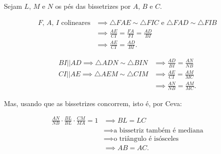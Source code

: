 Sejam $L$, $M$ e $N$ os pés das bissetrizes por $A$, $B$ e $C$.

\begin{align*}
	\text{$F$, $A$, $I$ colineares} & \implies \triangle FAE \sim \triangle FIC \text{\ \ e\ \ } \triangle FAD \sim \triangle FIB \\
	& \implies \frac{AE}{CI} = \frac{FA}{FI} = \frac{AD}{BI} \\
	& \implies \frac{AE}{CI} = \frac{AD}{BI}.
\end{align*}

\begin{align*}
	BI || AD \implies \triangle ADN \sim \triangle BIN & \implies \frac{AD}{BI} = \frac{AN}{NB} \\
	CI || AE \implies \triangle AEM \sim \triangle CIM & \implies \frac{AE}{CI} = \frac{AM}{MC} \\
	         										   & \implies \frac{AN}{NB} = \frac{AM}{MC}.
\end{align*}

Mas, usando que as bissetrizes concorrem, isto é, por Ceva:

\begin{align*}
	\frac{AN}{NB} \cdot \frac{BL}{BL} \cdot \frac{CM}{MA} = 1	& \implies BL = LC \\
												& \implies \text{a bissetriz também é mediana} \\
												& \implies \text{o triângulo é isósceles} \\
												& \implies AB = AC.
\end{align*}
